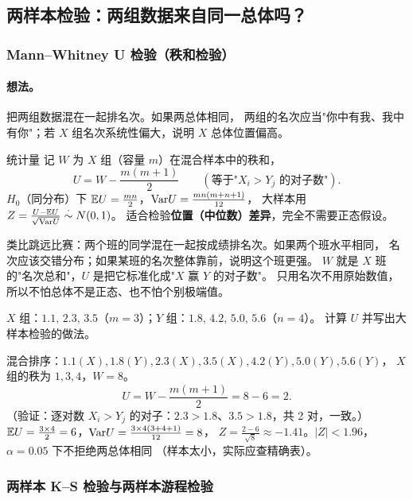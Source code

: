 \subsection{两样本检验：两组数据来自同一总体吗？}

\subsubsection{Mann--Whitney U 检验（秩和检验）}

\paragraph{想法。}把两组数据混在一起排名次。如果两总体相同，
两组的名次应当"你中有我、我中有你"；若 $X$ 组名次系统性偏大，说明 $X$ 总体位置偏高。

\begin{kbox}{统计量}
记 $W$ 为 $X$ 组（容量 $m$）在混合样本中的秩和，
\[
U=W-\frac{m(m+1)}{2}\qquad(\text{等于"}X_i>Y_j\text{ 的对子数"}).
\]
$H_0$（同分布）下 $\mathbb{E} U=\frac{mn}{2}$，$\mathrm{Var} U=\frac{mn(m+n+1)}{12}$，
大样本用 $Z=\frac{U-\mathbb{E} U}{\sqrt{\mathrm{Var} U}}\overset{\cdot}{\sim}N(0,1)$。
适合检验\textbf{位置（中位数）差异}，完全不需要正态假设。
\end{kbox}

\begin{pbox}
类比跳远比赛：两个班的同学混在一起按成绩排名次。如果两个班水平相同，
名次应该交错分布；如果某班的名次整体靠前，说明这个班更强。
$W$ 就是 $X$ 班的"名次总和"，$U$ 是把它标准化成"$X$ 赢 $Y$ 的对子数"。
只用名次不用原始数值，所以不怕总体不是正态、也不怕个别极端值。
\end{pbox}

\begin{exbox}[U 检验计算]
$X$ 组：$1.1,\,2.3,\,3.5$（$m=3$）；$Y$ 组：$1.8,\,4.2,\,5.0,\,5.6$（$n=4$）。
计算 $U$ 并写出大样本检验的做法。
\end{exbox}
\begin{sol}
混合排序：$1.1(X),1.8(Y),2.3(X),3.5(X),4.2(Y),5.0(Y),5.6(Y)$，
$X$ 组的秩为 $1,3,4$，$W=8$。
\[
U=W-\frac{m(m+1)}{2}=8-6=2 .
\]
（验证：逐对数 $X_i>Y_j$ 的对子：$2.3>1.8$、$3.5>1.8$，共 2 对，一致。）
$\mathbb{E} U=\frac{3\times4}{2}=6$，$\mathrm{Var} U=\frac{3\times4(3+4+1)}{12}=8$，
$Z=\frac{2-6}{\sqrt8}\approx-1.41$。$|Z|<1.96$，$\alpha=0.05$ 下不拒绝两总体相同
（样本太小，实际应查精确表）。
\end{sol}

\subsubsection{两样本 K--S 检验与两样本游程检验}

